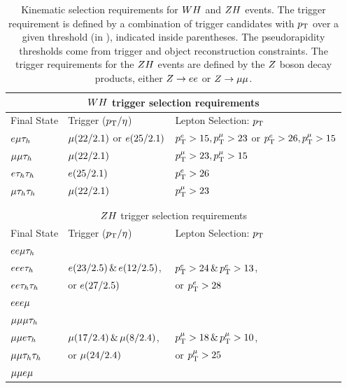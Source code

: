 \begin{table}[htbp]
\centering
\begin{small}
\begin{tabular}{lll}
     \multicolumn{3}{c}{$WH$ trigger selection requirements}                 \\ 
\hline
  Final State           &         Trigger ($p_\mathrm{T}/\eta$)         & Lepton Selection: $p_\mathrm{T}$     \\
\hline
 $e\mu\tau_{h}$      &  $\mu (22/2.1)$ or $e (25/2.1)$  &     $p_\mathrm{T}^{e}>15, p_\mathrm{T}^{\mu}>23$ or $p_\mathrm{T}^{e}>26, p_\mathrm{T}^{\mu}>15$  \\ 
 $\mu\mu\tau_{h}$     &  $\mu (22/2.1)$                    &     $p_\mathrm{T}^{\mu}>23,p_\mathrm{T}^{\mu}>15$                               \\ 
 $e\tau_{h}\tau_{h}$     &  $e (25/2.1)$                     &     $p_\mathrm{T}^{e}>26$                                            \\ 
 $\mu\tau_{h}\tau_{h}$    &  $\mu (22/2.1)$                    &     $p_\mathrm{T}^{\mu}>23$                                           \\ 
\hline \\

\\
     \multicolumn{3}{c}{$ZH$ trigger selection requirements}                 \\ 
\hline
  Final State           &         Trigger ($p_\mathrm{T}/\eta$)         & Lepton Selection: $p_\mathrm{T}$             \\
\hline
  $ee\mu\tau_{h}$     &                                    &                                   \\ 
  $eee\tau_{h}$      & $e(23/2.5)\,\&\,e(12/2.5)$,    &  $p_\mathrm{T}^{e}>24\,\&\,p_\mathrm{T}^{e}>13$,    \\ 
  $ee\tau_{h}\tau_{h}$    & or $e(27/2.5)$                   &  or $p_\mathrm{T}^{e}>28$                  \\ 
  $eee\mu$       &                                    &                                   \\ 
\hline
  $\mu\mu\mu\tau_{h}$   &                                    &                                   \\ 
  $\mu\mu e\tau_{h}$    &  $\mu(17/2.4)\,\&\,\mu(8/2.4)$,  &  $p_\mathrm{T}^{\mu}>18\,\&\,p_\mathrm{T}^{\mu}>10$,  \\ 
  $\mu\mu\tau_{h}\tau_{h}$  &   or $\mu(24/2.4)$                &  or $p_\mathrm{T}^{\mu}>25$                 \\ 
  $\mu\mu e\mu$     &                                    &                                   \\ 
\hline
\end{tabular}
\end{small}
\caption{Kinematic selection requirements for $WH$ and $ZH$ events.
The trigger requirement is defined by a combination of trigger candidates with 
$p_\mathrm{T}$ over a given threshold (in \GeV), indicated inside parentheses. The 
pseudorapidity thresholds come from trigger and object reconstruction constraints.
The trigger requirements for the $ZH$ events are defined by the $Z$ boson
decay products, either $Z\to ee$ or $Z\to\mu\mu$.
\label{tab:vh_triggers}
}
\end{table}
